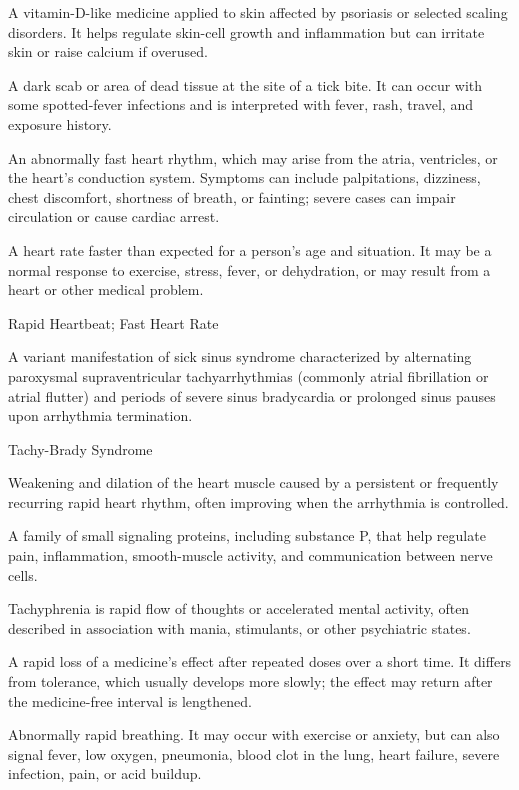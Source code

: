  A vitamin-D-like medicine applied to skin affected by psoriasis or selected scaling disorders. It helps regulate skin-cell growth and inflammation but can irritate skin or raise calcium if overused.

 A dark scab or area of dead tissue at the site of a tick bite. It can occur with some spotted-fever infections and is interpreted with fever, rash, travel, and exposure history.

 An abnormally fast heart rhythm, which may arise from the atria, ventricles, or the heart's conduction
system. Symptoms can include palpitations, dizziness, chest discomfort, shortness of breath,
or fainting; severe cases can impair circulation or cause cardiac arrest.

 A heart rate faster than expected for a person’s age and situation. It may be a normal response to exercise, stress, fever, or dehydration, or may result from a heart or other medical problem.

\synonyms
Rapid Heartbeat; Fast Heart Rate

 A variant manifestation of sick sinus syndrome characterized by alternating paroxysmal supraventricular tachyarrhythmias (commonly atrial fibrillation or atrial flutter) and periods of severe sinus bradycardia or prolonged sinus pauses upon arrhythmia termination.

\synonyms
Tachy-Brady Syndrome

 Weakening and dilation of the heart muscle caused by a persistent or frequently recurring rapid heart rhythm, often improving when the arrhythmia is controlled.

 A family of small signaling proteins, including substance P, that help regulate pain, inflammation, smooth-muscle activity, and communication between nerve cells.

 Tachyphrenia is rapid flow of thoughts or accelerated mental activity, often described in association with mania, stimulants, or other psychiatric states.

 A rapid loss of a medicine’s effect after repeated doses over a short time. It differs from tolerance, which usually develops more slowly; the effect may return after the medicine-free interval is lengthened.

 Abnormally rapid breathing. It may occur with exercise or anxiety, but can also signal fever, low oxygen, pneumonia, blood clot in the lung, heart failure, severe infection, pain, or acid buildup.

